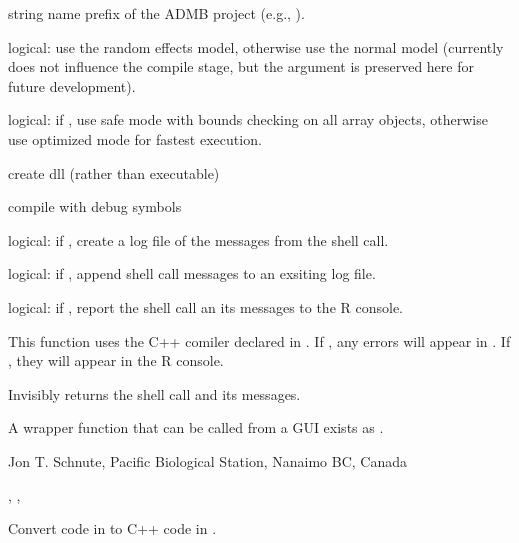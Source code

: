 \documentclass[letterpaper]{book}
\begin{document}
%
\begin{Arguments}
\begin{ldescription}
\item[\code{prefix}] string name prefix of the ADMB project (e.g., ).
\item[\code{raneff}] logical: use the random effects model, otherwise use the normal model
(currently does not influence the compile stage, but the argument is preserved
here for future development).
\item[\code{safe}] logical: if , use safe mode with bounds checking on all
array objects, otherwise use optimized mode for fastest execution.
\item[\code{dll}] create dll (rather than executable)
\item[\code{debug}] compile with debug symbols
\item[\code{logfile}] logical: if , create a log file of the messages from the shell call.
\item[\code{add}] logical: if , append shell call messages to an exsiting log file.
\item[\code{verbose}] logical: if , report the shell call an its messages to the R console.
\end{ldescription}
\end{Arguments}
%
\begin{Details}\relax
This function uses the C++ comiler declared in . If ,
any errors will appear in . If ,
they will appear in the R console.
\end{Details}
%
\begin{Value}
Invisibly returns the shell call and its messages.
\end{Value}
%
\begin{Note}\relax
A wrapper function that can be called from a GUI exists as .
\end{Note}
%
\begin{Author}\relax
 Jon T. Schnute, Pacific Biological Station, Nanaimo BC, Canada 
\end{Author}
%
\begin{SeeAlso}\relax
 , ,  
\end{SeeAlso}
%
\begin{Description}\relax
Convert code in  to C++ code in .
\end{Description}
\end{document}
